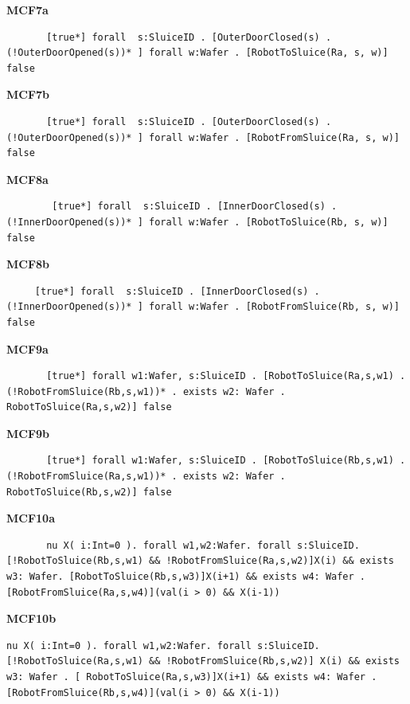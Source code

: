 \documentclass[12pt]{report}
\begin{document}
    \textbf{MCF7a}
    \begin{lstlisting}
       [true*] forall  s:SluiceID . [OuterDoorClosed(s) . (!OuterDoorOpened(s))* ] forall w:Wafer . [RobotToSluice(Ra, s, w)] false
    \end{lstlisting}

    \textbf{MCF7b}
    \begin{lstlisting}
       [true*] forall  s:SluiceID . [OuterDoorClosed(s) . (!OuterDoorOpened(s))* ] forall w:Wafer . [RobotFromSluice(Ra, s, w)] false
    \end{lstlisting}

    \textbf{MCF8a}
    \begin{lstlisting}
        [true*] forall  s:SluiceID . [InnerDoorClosed(s) . (!InnerDoorOpened(s))* ] forall w:Wafer . [RobotToSluice(Rb, s, w)] false
    \end{lstlisting}

    \textbf{MCF8b}
    \begin{lstlisting}
     [true*] forall  s:SluiceID . [InnerDoorClosed(s) . (!InnerDoorOpened(s))* ] forall w:Wafer . [RobotFromSluice(Rb, s, w)] false
    \end{lstlisting}

    \textbf{MCF9a}
    \begin{lstlisting}
       [true*] forall w1:Wafer, s:SluiceID . [RobotToSluice(Ra,s,w1) . (!RobotFromSluice(Rb,s,w1))* . exists w2: Wafer . RobotToSluice(Ra,s,w2)] false
    \end{lstlisting}

    \textbf{MCF9b}
    \begin{lstlisting}
       [true*] forall w1:Wafer, s:SluiceID . [RobotToSluice(Rb,s,w1) . (!RobotFromSluice(Ra,s,w1))* . exists w2: Wafer . RobotToSluice(Rb,s,w2)] false
    \end{lstlisting}

    \textbf{MCF10a}
    \begin{lstlisting}
       nu X( i:Int=0 ). forall w1,w2:Wafer. forall s:SluiceID. [!RobotToSluice(Rb,s,w1) && !RobotFromSluice(Ra,s,w2)]X(i) && exists w3: Wafer. [RobotToSluice(Rb,s,w3)]X(i+1) && exists w4: Wafer .[RobotFromSluice(Ra,s,w4)](val(i > 0) && X(i-1)) 
    \end{lstlisting}

    \textbf{MCF10b}
    \begin{lstlisting}
nu X( i:Int=0 ). forall w1,w2:Wafer. forall s:SluiceID. [!RobotToSluice(Ra,s,w1) && !RobotFromSluice(Rb,s,w2)] X(i) && exists w3: Wafer . [ RobotToSluice(Ra,s,w3)]X(i+1) && exists w4: Wafer .[RobotFromSluice(Rb,s,w4)](val(i > 0) && X(i-1))
    \end{lstlisting}
\end{document}
